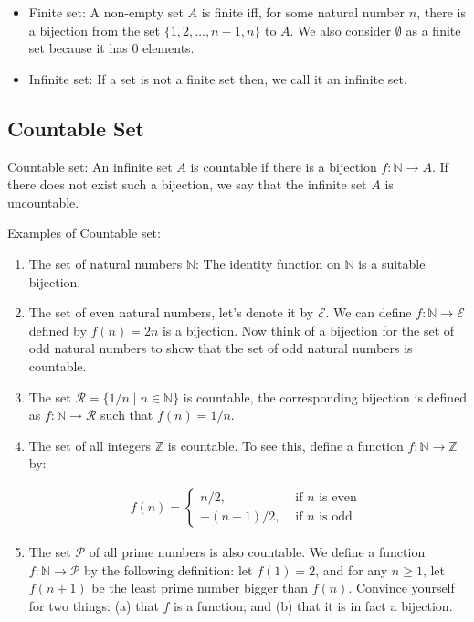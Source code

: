 \documentclass[12pt,a4paper,fleqn]{article}
\begin{document}
 \begin{itemize}
  \item  Finite set: A non-empty set \(A\) is finite iff, for some natural number \(n\), there is a bijection from the set \( \{ 1,2, \ldots, n-1, n\} \) to \(A\). We also consider \(\emptyset \) as a finite set because it has 0 elements.
  \item Infinite set: If a set is not a finite set then, we call it an infinite set.
 \end{itemize}

  \subsection{Countable Set} 
  Countable set: An infinite set \(A\) is countable if there is a bijection \(f: \mathbb{N} \rightarrow A\). If there does not exist such a bijection, we say that the infinite set \(A\) is uncountable.

  Examples of Countable set:
  \begin{enumerate}
   
    \item The set of natural numbers \(\mathbb{N}\): The identity function on \(\mathbb{N}\) is a suitable bijection.
    \item The set of even natural numbers, let's denote it by \(\mathcal{E}\). We can define \(f: \mathbb{N} \rightarrow \mathcal{E}\) defined by \(f(n)=2 n\) is a bijection. Now think of a bijection for the set of odd natural numbers to show that the set of odd natural numbers is countable.
    \item The set \(\mathcal{R}=\{1 / n \mid n \in \mathbb{N}\} \) is countable, the corresponding bijection is defined as \(f: \mathbb{N} \rightarrow \mathcal{R}\) such that \(f(n)=1 / n\).
    \item The set of all integers \(\mathbb{Z}\) is countable. To see this, define a function \(f: \mathbb{N} \rightarrow \mathbb{Z}\) by:
    
    \begin{align*}
    f(n)= \begin{cases}n / 2, & \text { if } n \text { is even } \\ -(n-1) / 2, & \text { if } n \text { is odd }\end{cases}
    \end{align*}
    
    \item The set \(\mathcal{P}\) of all prime numbers is also countable. We define a function \(f: \mathbb{N} \rightarrow \mathcal{P}\) by the following definition: let \(f(1)=2\), and for any \(n \geq 1\), let \(f(n+1)\) be the least prime number bigger than \(f(n)\). Convince yourself for two things: (a) that \(f\) is a function; and (b) that it is in fact a bijection.
  \end{enumerate}
\end{document}

